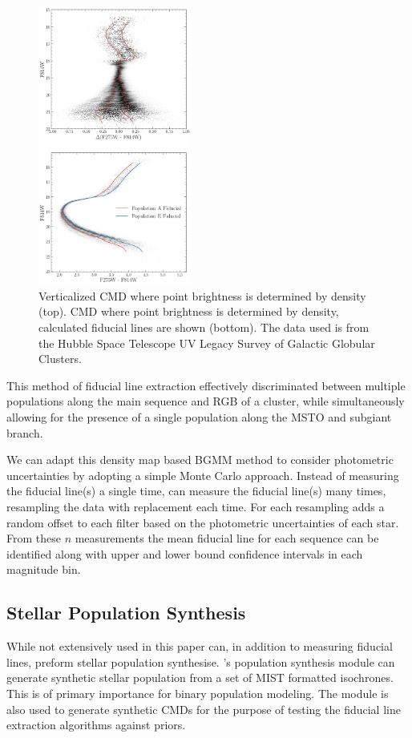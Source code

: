 \begin{figure}
	\centering
	\includegraphics[width=0.45\textwidth]{vertFit.png}
  \caption{Verticalized CMD where point brightness is determined by density
  (top). CMD where point brightness is determined by density, calculated
  fiducial lines are shown (bottom). The data used is from the Hubble Space
  Telescope UV Legacy Survey of Galactic Globular Clusters.}
	\label{fig:vertFit}
\end{figure}

This method of fiducial line extraction effectively discriminated between
multiple populations along the main sequence and RGB of a cluster, while
simultaneously allowing for the presence of a single population along the MSTO
and subgiant branch. 

We can adapt this density map based BGMM method to consider photometric
uncertainties by adopting a simple Monte Carlo approach. Instead of measuring
the fiducial line(s) a single time, \fidanka can measure the fiducial line(s)
many times, resampling the data with replacement each time. For each resampling
\fidanka adds a random offset to each filter based on the photometric
uncertainties of each star. From these $n$ measurements the mean fiducial line
for each sequence can be identified along with upper and lower bound confidence
intervals in each magnitude bin.

\subsection{Stellar Population Synthesis}
While not extensively used in this paper \fidanka can, in addition to measuring fiducial
lines, preform stellar population synthesise. \fidanka's population synthesis
module can generate synthetic stellar population from a set of MIST formatted
isochrones. This is of primary importance for binary population modeling. The
module is also used to generate synthetic CMDs for the purpose of testing the
fiducial line extraction algorithms against priors.


